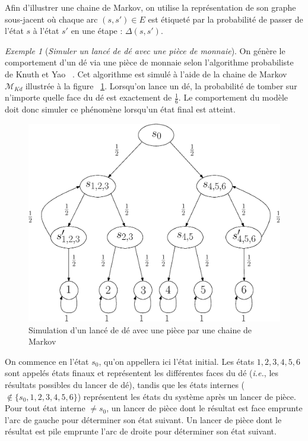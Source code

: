\documentclass[12pt,a4paper]{report}
\theoremstyle{definition}%
\theoremstyle{remark}
\newtheorem{example}{Exemple}[chapter]
\newcommand{\ie}{\textit{i.e.}, }
\let\labelitemi\labelitemii
\begin{document}
Afin d'illustrer une chaine de Markov, on utilise la représentation de son graphe sous-jacent où 
chaque arc $(s, s') \in E$ est étiqueté par la probabilité de passer de l'état $s$ à l'état $s'$ en une étape : $\Delta(s, s')$.

\begin{example} [\textit{Simuler un lancé de dé avec une pièce de monnaie}] \label{knuthdie}
	On génère le comportement d'un dé via une pièce de monnaie selon l'algorithme probabiliste de Knuth et Yao ~\cite{KY76}. Cet algorithme est simulé à l'aide de la chaine de Markov $\mathcal{M}_{Kd}$ illustrée à la figure ~\ref{diebyacoin}. Lorsqu'on lance un dé, la probabilité de tomber sur n'importe quelle face du dé est exactement de $\frac{1}{6}$. Le comportement du modèle doit donc simuler ce phénomène lorsqu'un état final est atteint.
	\begin{figure}[H]
		\centering
		\includegraphics[scale=0.5]{figures/dieByaCoin.eps}
		\caption{Simulation d'un lancé de dé avec une pièce par une chaine de Markov}
		\label{diebyacoin}
	\end{figure}
	On commence en l'état $s_0$, qu'on appellera ici l'état initial. Les états $1, 2, 3, 4, 5, 6$ sont appelés états finaux et représentent les différentes faces du dé (\ie les résultats possibles du lancer de dé), tandis que les états internes ($\notin \{s_0, 1, 2, 3, 4, 5, 6\}$) représentent les états du système après un lancer de pièce. Pour tout état interne $\neq s_0$, un lancer de pièce dont le résultat est face emprunte l'arc de gauche pour déterminer son état suivant. Un lancer de pièce dont le résultat est pile emprunte l'arc de droite pour déterminer son état suivant.\\
	

\end{example}
\end{document}
